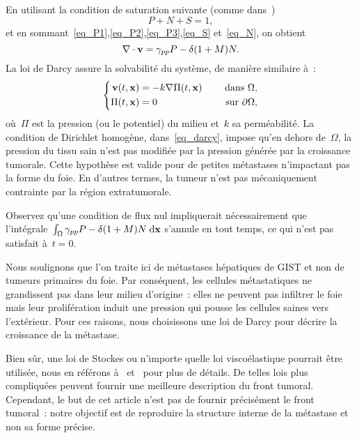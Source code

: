 \documentclass[main.tex]{subfiles}
\begin{document}
En utilisant la condition de saturation suivante 
(comme dans~\cite{ambrosi2002})
\begin{equation}\label{eq_saturation}
P+N+S=1,
\end{equation}
et en sommant~\eqref{eq_P1},\eqref{eq_P2},\eqref{eq_P3},\eqref{eq_S} et~\eqref{eq_N},
on obtient 
\begin{equation}\label{eq_divv}
\nabla\cdot \mathbf{v} = \gamma_{pp} P - \delta (1+M)N.
\end{equation}
La loi de Darcy assure la solvabilité du système, de manière similaire à~\cite{Ribba2006532}:
\begin{equation}\label{eq_darcy}
\left\{
\begin{aligned}
\mathbf{v}(t,\mathbf{x}) &=-k\nabla \Pi(t,\mathbf{x}) & \quad \textrm{ dans }  \Omega , \\
\Pi(t,\mathbf{x}) &=0 & \quad \textrm{ sur  } \partial \Omega,
\end{aligned}
\right.
\end{equation}
où~$\Pi$ est la pression (ou le potentiel) du milieu et~$k$ sa perméabilité. La condition de Dirichlet homogène, dans~\eqref{eq_darcy}, impose qu'en dehors de~$\Omega$, la pression du tissu sain n'est pas modifiée par la pression générée par la croissance tumorale. Cette hypothèse est valide pour de petites métastases n'impactant pas la forme du foie. En d'autres termes, la tumeur n'est pas mécaniquement contrainte par la région extratumorale. 


Observez qu'une condition de flux nul impliquerait nécessairement que l'intégrale~$\int_{\Omega} \gamma_{pp} P - \delta (1+M)N \textrm{\;d}\mathbf{x}$ s'annule en tout temps, ce qui n'est pas satisfait à~$t=0$.


Nous soulignons que l'on traite ici de métastases hépatiques de GIST et non de tumeurs primaires du foie. Par conséquent, les cellules métastatiques ne grandissent pas dans leur milieu d'origine~: elles ne peuvent pas infiltrer le foie mais leur prolifération induit une pression qui pousse les cellules saines vers l'extérieur. Pour ces raisons, nous choisissons une loi de Darcy pour décrire la croissance de la métastase. 


Bien sûr, une loi de Stockes ou n'importe quelle loi viscoélastique pourrait être utilisée, nous en  référons à~\cite{Bresch2009} et~\cite{ambrosi2002,byrne2003} pour plus de détails. De telles lois plus compliquées peuvent fournir une meilleure description du front tumoral. Cependant, le but de cet article n'est pas de fournir précisément le front tumoral~: notre objectif est de reproduire la structure interne de la métastase et non sa forme précise. 
\end{document}
